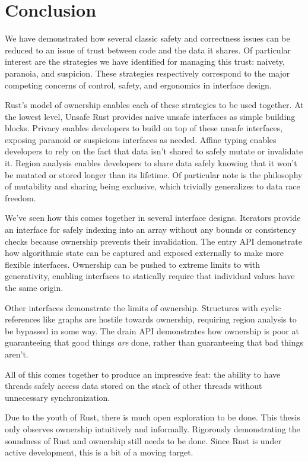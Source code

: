 \chapter{Conclusion}
\label{ch:outro}

We have demonstrated how several classic safety and correctness issues can
be reduced to an issue of trust between code and the data it shares. Of particular
interest are the strategies we have identified for managing this trust:
naivety, paranoia, and suspicion. These strategies respectively correspond to the major
competing concerns of control, safety, and ergonomics in interface design.

Rust's model of ownership enables each of these strategies to
be used together. At the lowest level, Unsafe Rust provides naive unsafe interfaces
as simple building blocks. Privacy enables developers to build on top of these
unsafe interfaces, exposing paranoid or suspicious interfaces as needed. Affine
typing enables developers to rely on the fact that data isn't shared to safely
mutate or invalidate it. Region analysis enables developers to share data
safely knowing that it won't be mutated or stored longer than its lifetime.
Of particular note is the philosophy of mutability and sharing being exclusive,
which trivially generalizes to data race freedom.

We've seen how this comes together in several interface designs. Iterators
provide an interface for safely indexing into an array without any
bounds or consistency checks because ownership prevents their invalidation.
The entry API demonstrate how algorithmic state can be captured and exposed externally
to make more flexible interfaces. Ownership can be pushed to extreme limits to
with generativity, enabling interfaces to statically require that individual
values have the same origin.

Other interfaces demonstrate the limits of ownership. Structures with cyclic
references like graphs are hostile towards ownership, requiring region analysis
to be bypassed in some way. The drain API demonstrates how ownership is poor
at guaranteeing that good things \emph{are} done, rather than guaranteeing that
bad things aren't.

All of this comes together to produce an impressive feat: the ability to have
threads safely access data stored on the stack of other threads without
unnecessary synchronization.

Due to the youth of Rust, there is much open exploration to be done. This
thesis only observes ownership intuitively and informally.
Rigorously demonstrating the soundness of Rust and ownership still needs to
be done. Since Rust is under active development, this is a bit of a moving
target.

